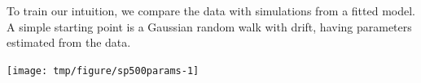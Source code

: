 \begin{frame}[fragile]
To train our intuition, we compare the data with simulations from a fitted model. A simple starting point is a Gaussian random walk with drift, having parameters estimated from the data.

\begin{knitrout}\small
{}\color{fgcolor}\begin{kframe}
\begin{alltt}
 \hlkwb{<-} \hlstd{(}\hlstd{(}
 \hlkwb{<-} \hlstd{(}\hlstd{(}
 \hlkwb{<-} 
 \hlkwb{<-} \hlstd{(sp500[}\hlstd{])}\hlopt{+}\hlstd{(}\hlstd{(}\hlstd{,}\hlopt{-}\hlstd{,}
 \hlkwb{<-} \hlstd{(sp500[}\hlstd{])}\hlopt{+}\hlstd{(}\hlstd{(}\hlstd{,}\hlopt{-}\hlstd{,}
\hlstd{=}\hlstd{) ;} \hlstd{=}\hlstd{)}
\end{alltt}
\end{kframe}
\end{knitrout}

\vspace{-8mm}

\begin{knitrout}\small
{}\color{fgcolor}

{\centering \texttt{[image: tmp/figure/sp500params-1]} 

}


\end{knitrout}

\end{frame}

